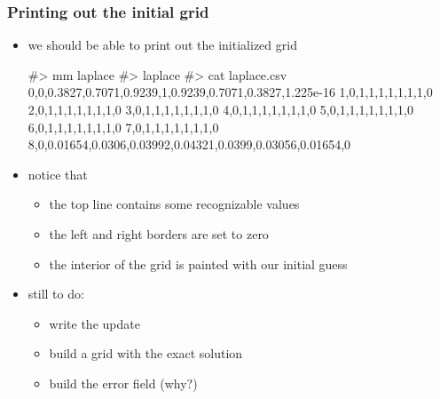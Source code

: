 \begin{frame}[fragile]
%
  \frametitle{Printing out the initial grid}
%
  \begin{itemize}
  \item we should be able to print out the initialized grid
%
  \begin{shell}{}
#> mm laplace
#> laplace
#> cat laplace.csv
0,0,0.3827,0.7071,0.9239,1,0.9239,0.7071,0.3827,1.225e-16
1,0,1,1,1,1,1,1,1,0
2,0,1,1,1,1,1,1,1,0
3,0,1,1,1,1,1,1,1,0
4,0,1,1,1,1,1,1,1,0
5,0,1,1,1,1,1,1,1,0
6,0,1,1,1,1,1,1,1,0
7,0,1,1,1,1,1,1,1,0
8,0,0.01654,0.0306,0.03992,0.04321,0.0399,0.03056,0.01654,0
  \end{shell}
%
  \item notice that
    \begin{itemize}
    \item the top line contains some recognizable values
    \item the left and right borders are set to zero
    \item the interior of the grid is painted with our initial guess
    \end{itemize}
%
  \item still to do:
    \begin{itemize}
    \item write the update
    \item build a grid with the exact solution 
    \item build the error field (why?)
    \end{itemize}
  \end{itemize}
%
\end{frame}

